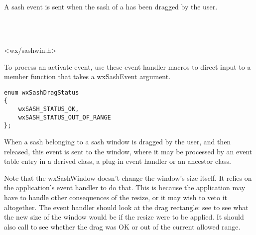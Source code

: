 \section{}\label{wxsashevent}

A sash event is sent when the sash of a  has been
dragged by the user.


\\
\\


<wx/sashwin.h>




To process an activate event, use these event handler macros to direct input to a member
function that takes a wxSashEvent argument.

\twocolwidtha{7cm}%
\begin{twocollist}\itemsep=0pt
\end{twocollist}


{\small
\begin{verbatim}
enum wxSashDragStatus
{
    wxSASH_STATUS_OK,
    wxSASH_STATUS_OUT_OF_RANGE
};
\end{verbatim}
}


When a sash belonging to a sash window is dragged by the user, and then released,
this event is sent to the window, where it may be processed by an event table
entry in a derived class, a plug-in event handler or an ancestor class.

Note that the wxSashWindow doesn't change the window's size itself. It relies on the application's
event handler to do that. This is because the application may have to handle other consequences
of the resize, or it may wish to veto it altogether. The event handler should
look at the drag rectangle: see  to see
what the new size of the window would be if the resize were to be applied. It should
also call  to see whether the
drag was OK or out of the current allowed range.

